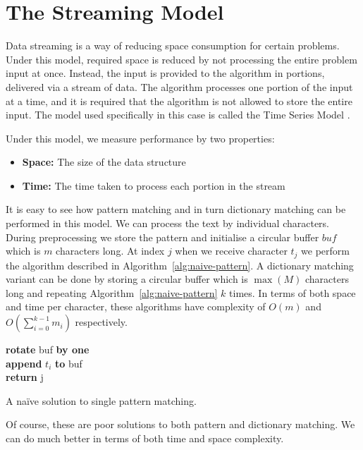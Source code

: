 \documentclass[ %
                    author={Dominic Joseph Moylett},
                    degree={MEng},
                     title={Dictionary Matching with Fingerprints},
                  subtitle={An Empirical Analysis},
                      type={research},
                      year={2015} ]{dissertation}
\begin{document}
\section{The Streaming Model}
\label{sec:streaming-model}

Data streaming \cite{TCS-002} is a way of reducing space consumption for certain problems. Under this model, required space is reduced by not processing the entire problem input at once. Instead, the input is provided to the algorithm in portions, delivered via a stream of data. The algorithm processes one portion of the input at a time, and it is required that the algorithm is not allowed to store the entire input. The model used specifically in this case is called the Time Series Model \cite{TCS-002}.

Under this model, we measure performance by two properties:
\begin{itemize}
  \item {\bf Space:} The size of the data structure
  \item {\bf Time:} The time taken to process each portion in the stream
\end{itemize}

It is easy to see how pattern matching and in turn dictionary matching can be performed in this model. We can process the text by individual characters. During preprocessing we store the pattern and initialise a circular buffer $buf$ which is $m$ characters long. At index $j$ when we receive character $t_j$ we perform the algorithm described in Algorithm~\ref{alg:naive-pattern}. A dictionary matching variant can be done by storing a circular buffer which is $\max(M)$ characters long and repeating Algorithm~\ref{alg:naive-pattern} $k$ times. In terms of both space and time per character, these algorithms have complexity of $O(m)$ and $O(\sum^{k-1}_{i=0}m_i)$ respectively.

\begin{algorithm}[t]
{\bf rotate} buf {\bf by one}\\
{\bf append} $t_i$ {\bf to} buf\\
{\bf return} j
\caption{A na\"{i}ve solution to single pattern matching.}
\label{alg:naive-pattern}
\end{algorithm}

Of course, these are poor solutions to both pattern and dictionary matching. We can do much better in terms of both time and space complexity.
\end{document}
